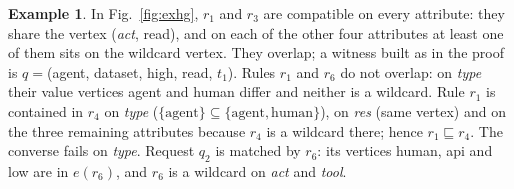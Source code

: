 \documentclass[preprint,12pt]{elsarticle}
\theoremstyle{definition}
\newtheorem{example}{Example}
\begin{document}
\begin{example}
\label{ex:relations}
In Fig.~\ref{fig:exhg}, $r_1$ and $r_3$ are compatible on every attribute: they share the vertex (\textit{act}, read), and on each of the other four attributes at least one of them sits on the wildcard vertex. They overlap; a witness built as in the proof is $q=$(agent, dataset, high, read, $t_1$). Rules $r_1$ and $r_6$ do not overlap: on \textit{type} their value vertices agent and human differ and neither is a wildcard. Rule $r_1$ is contained in $r_4$ on \textit{type} ($\{\text{agent}\}\subseteq\{\text{agent},\text{human}\}$), on \textit{res} (same vertex) and on the three remaining attributes because $r_4$ is a wildcard there; hence $r_1\sqsubseteq r_4$. The converse fails on \textit{type}. Request $q_2$ is matched by $r_6$: its vertices human, api and low are in $e(r_6)$, and $r_6$ is a wildcard on \textit{act} and \textit{tool}.
\end{example}
\end{document}
